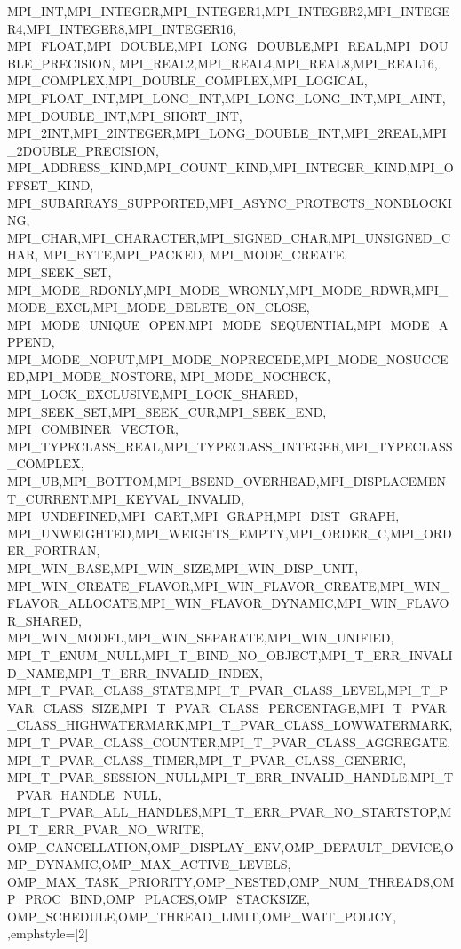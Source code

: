 {{{{{    MPI_INT,MPI_INTEGER,MPI_INTEGER1,MPI_INTEGER2,MPI_INTEGER4,MPI_INTEGER8,MPI_INTEGER16,
    MPI_FLOAT,MPI_DOUBLE,MPI_LONG_DOUBLE,MPI_REAL,MPI_DOUBLE_PRECISION,
    MPI_REAL2,MPI_REAL4,MPI_REAL8,MPI_REAL16,
    MPI_COMPLEX,MPI_DOUBLE_COMPLEX,MPI_LOGICAL,
    MPI_FLOAT_INT,MPI_LONG_INT,MPI_LONG_LONG_INT,MPI_AINT,MPI_DOUBLE_INT,MPI_SHORT_INT,
    MPI_2INT,MPI_2INTEGER,MPI_LONG_DOUBLE_INT,MPI_2REAL,MPI_2DOUBLE_PRECISION,
    MPI_ADDRESS_KIND,MPI_COUNT_KIND,MPI_INTEGER_KIND,MPI_OFFSET_KIND,
    MPI_SUBARRAYS_SUPPORTED,MPI_ASYNC_PROTECTS_NONBLOCKING,
    MPI_CHAR,MPI_CHARACTER,MPI_SIGNED_CHAR,MPI_UNSIGNED_CHAR,
    MPI_BYTE,MPI_PACKED, MPI_MODE_CREATE,
    MPI_SEEK_SET,
    MPI_MODE_RDONLY,MPI_MODE_WRONLY,MPI_MODE_RDWR,MPI_MODE_EXCL,MPI_MODE_DELETE_ON_CLOSE,
    MPI_MODE_UNIQUE_OPEN,MPI_MODE_SEQUENTIAL,MPI_MODE_APPEND,
    MPI_MODE_NOPUT,MPI_MODE_NOPRECEDE,MPI_MODE_NOSUCCEED,MPI_MODE_NOSTORE,
    MPI_MODE_NOCHECK, MPI_LOCK_EXCLUSIVE,MPI_LOCK_SHARED,
    MPI_SEEK_SET,MPI_SEEK_CUR,MPI_SEEK_END,
    MPI_COMBINER_VECTOR,
    MPI_TYPECLASS_REAL,MPI_TYPECLASS_INTEGER,MPI_TYPECLASS_COMPLEX,
    MPI_UB,MPI_BOTTOM,MPI_BSEND_OVERHEAD,MPI_DISPLACEMENT_CURRENT,MPI_KEYVAL_INVALID,
    MPI_UNDEFINED,MPI_CART,MPI_GRAPH,MPI_DIST_GRAPH,
    MPI_UNWEIGHTED,MPI_WEIGHTS_EMPTY,MPI_ORDER_C,MPI_ORDER_FORTRAN,
    MPI_WIN_BASE,MPI_WIN_SIZE,MPI_WIN_DISP_UNIT,
    MPI_WIN_CREATE_FLAVOR,MPI_WIN_FLAVOR_CREATE,MPI_WIN_FLAVOR_ALLOCATE,MPI_WIN_FLAVOR_DYNAMIC,MPI_WIN_FLAVOR_SHARED,
    MPI_WIN_MODEL,MPI_WIN_SEPARATE,MPI_WIN_UNIFIED,
    MPI_T_ENUM_NULL,MPI_T_BIND_NO_OBJECT,MPI_T_ERR_INVALID_NAME,MPI_T_ERR_INVALID_INDEX,
    MPI_T_PVAR_CLASS_STATE,MPI_T_PVAR_CLASS_LEVEL,MPI_T_PVAR_CLASS_SIZE,MPI_T_PVAR_CLASS_PERCENTAGE,MPI_T_PVAR_CLASS_HIGHWATERMARK,MPI_T_PVAR_CLASS_LOWWATERMARK,MPI_T_PVAR_CLASS_COUNTER,MPI_T_PVAR_CLASS_AGGREGATE,MPI_T_PVAR_CLASS_TIMER,MPI_T_PVAR_CLASS_GENERIC,
    MPI_T_PVAR_SESSION_NULL,MPI_T_ERR_INVALID_HANDLE,MPI_T_PVAR_HANDLE_NULL,
    MPI_T_PVAR_ALL_HANDLES,MPI_T_ERR_PVAR_NO_STARTSTOP,MPI_T_ERR_PVAR_NO_WRITE,
    OMP_CANCELLATION,OMP_DISPLAY_ENV,OMP_DEFAULT_DEVICE,OMP_DYNAMIC,OMP_MAX_ACTIVE_LEVELS,
    OMP_MAX_TASK_PRIORITY,OMP_NESTED,OMP_NUM_THREADS,OMP_PROC_BIND,OMP_PLACES,OMP_STACKSIZE,
    OMP_SCHEDULE,OMP_THREAD_LIMIT,OMP_WAIT_POLICY,
  },emphstyle={[2]\color{green!40!black}}
}

}}}
